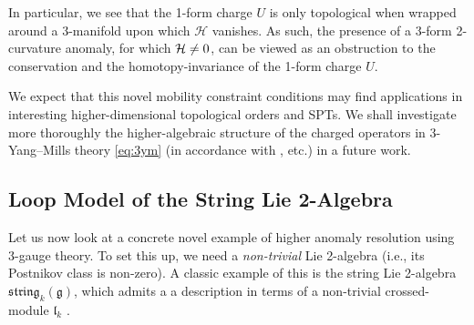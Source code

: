 \documentclass[onecolumn]{article}
\theoremstyle{theorem}
\theoremstyle{remark}
\theoremstyle{example}
\theoremstyle{definition}
\numberwithin{equation}{section}
\def\g{\mathfrak g}
\newcommand{\cH}{{\cal H}}
\begin{document}
{In} %
 particular, we see that the 1-form charge $U$ is only topological when wrapped around a 3-manifold upon which $\mathcal{H}$ vanishes. As such, the presence of a 3-form 2-curvature anomaly, for which $\cH\neq 0$, can be viewed as an obstruction to the conservation and the homotopy-invariance of the 1-form charge $U$. 





We expect that this novel mobility constraint conditions may find applications in interesting higher-dimensional topological orders and SPTs. We shall investigate more thoroughly  the higher-algebraic structure of the charged operators in 3-Yang--Mills theory \eqref{eq:3ym} (in accordance with \cite{Gaiotto:2014kfa,costello_gwilliam_2016,Costello:2020ndc,Budzik:2022mpd,Zeng:2023qqp}, etc.) in a future work.
 



\subsection{Loop Model of the String Lie 2-Algebra}\label{loopgauge}
Let us now look at a concrete novel example of higher anomaly resolution using 3-gauge theory. To set this up, we need a \textit{{non-trivial}} Lie 2-algebra (i.e., its Postnikov class is non-zero). A classic example of this is the string Lie 2-algebra $\mathfrak{string}_k(\mathfrak{g})$, which admits a a description in terms of a non-trivial crossed-module $\mathfrak{l}_k$ \cite{Baez:2005sn}.
\end{document}
